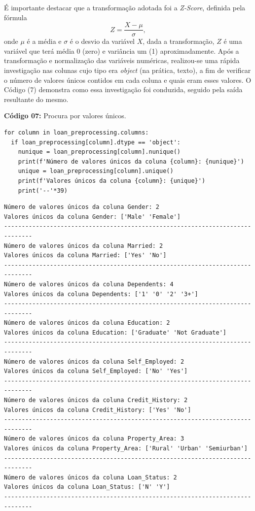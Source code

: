 \documentclass[a4paper,12pt]{article} %
\begin{document}
É importante destacar que a transformação adotada foi a \textit{Z-Score}, definida pela fórmula $$Z = \dfrac{X - \mu}{\sigma},$$ onde $\mu$ é a média e $\sigma$ é o desvio da variável $X$, dada a transformação, $Z$ é uma variável que terá média 0 (zero) e variância um (1) \cite{bussab2010estatistica} aproximadamente. Após a transformação e normalização das variáveis numéricas, realizou-se uma rápida investigação nas colunas cujo tipo era \textit{object} (na prática, texto), a fim de verificar o número de valores únicos contidos em cada coluna e quais eram esses valores. O Código (7) demonstra como essa investigação foi conduzida, seguido pela saída resultante do mesmo.
\begin{center}
\textbf{Código 07:} Procura por valores únicos.
\begin{verbatim}
for column in loan_preprocessing.columns:
  if loan_preprocessing[column].dtype == 'object':
    nunique = loan_preprocessing[column].nunique()
    print(f'Número de valores únicos da coluna {column}: {nunique}')
    unique = loan_preprocessing[column].unique()
    print(f'Valores únicos da coluna {column}: {unique}')
    print('--'*39)
\end{verbatim}
\end{center}
\begin{verbatim}
Número de valores únicos da coluna Gender: 2
Valores únicos da coluna Gender: ['Male' 'Female']
------------------------------------------------------------------------------
Número de valores únicos da coluna Married: 2
Valores únicos da coluna Married: ['Yes' 'No']
------------------------------------------------------------------------------
Número de valores únicos da coluna Dependents: 4
Valores únicos da coluna Dependents: ['1' '0' '2' '3+']
------------------------------------------------------------------------------
Número de valores únicos da coluna Education: 2
Valores únicos da coluna Education: ['Graduate' 'Not Graduate']
------------------------------------------------------------------------------
Número de valores únicos da coluna Self_Employed: 2
Valores únicos da coluna Self_Employed: ['No' 'Yes']
------------------------------------------------------------------------------
Número de valores únicos da coluna Credit_History: 2
Valores únicos da coluna Credit_History: ['Yes' 'No']
------------------------------------------------------------------------------
Número de valores únicos da coluna Property_Area: 3
Valores únicos da coluna Property_Area: ['Rural' 'Urban' 'Semiurban']
------------------------------------------------------------------------------
Número de valores únicos da coluna Loan_Status: 2
Valores únicos da coluna Loan_Status: ['N' 'Y']
------------------------------------------------------------------------------
\end{verbatim}
\end{document}
